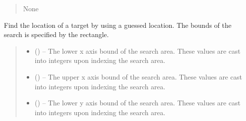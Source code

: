 \documentclass[letterpaper,11pt,english]{sphinxmanual}
\begin{document}
\begin{savenotes}
\begin{fulllineitems}
\begin{savenotes}
\begin{fulllineitems}
\begin{quote}
\begin{description}
\sphinxAtStartPar
None

\end{description}\end{quote}

\end{fulllineitems}\end{savenotes}


\begin{savenotes}\begin{fulllineitems}
\label{\detokenize{code/opihiexarata.gui.selector:opihiexarata.gui.selector.TargetSelectorWindow.find_target_location}}
\pysigstartsignatures
{}
\pysigstopsignatures
\sphinxAtStartPar
Find the location of a target by using a guessed location.
The bounds of the search is specified by the rectangle.
\begin{quote}\begin{description}
\begin{itemize}
\item {} 
\sphinxAtStartPar
{} () – The lower x axis bound of the search area. These values are cast
into integers upon indexing the search area.

\item {} 
\sphinxAtStartPar
{} () – The upper x axis bound of the search area. These values are cast
into integers upon indexing the search area.

\item {} 
\sphinxAtStartPar
{} () – The lower y axis bound of the search area. These values are cast
into integers upon indexing the search area.


\end{itemize}
\end{description}
\end{quote}
\end{fulllineitems}
\end{savenotes}
\end{fulllineitems}
\end{savenotes}
\end{document}

